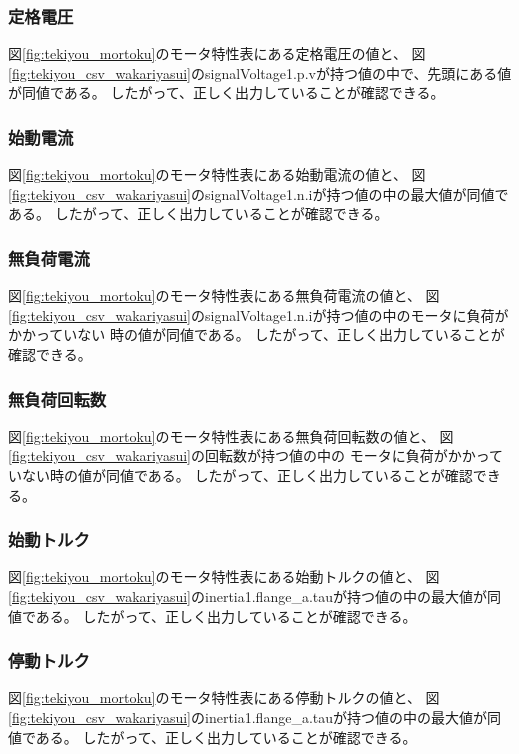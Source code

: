 \subsubsection{定格電圧}
図\ref{fig:tekiyou_mortoku}のモータ特性表にある定格電圧の値と、
図\ref{fig:tekiyou_csv_wakariyasui}のsignalVoltage1.p.vが持つ値の中で、先頭にある値が同値である。
したがって、正しく出力していることが確認できる。

\subsubsection{始動電流}
図\ref{fig:tekiyou_mortoku}のモータ特性表にある始動電流の値と、
図\ref{fig:tekiyou_csv_wakariyasui}のsignalVoltage1.n.iが持つ値の中の最大値が同値である。
したがって、正しく出力していることが確認できる。


\subsubsection{無負荷電流}
図\ref{fig:tekiyou_mortoku}のモータ特性表にある無負荷電流の値と、
図\ref{fig:tekiyou_csv_wakariyasui}のsignalVoltage1.n.iが持つ値の中のモータに負荷がかかっていない
時の値が同値である。
したがって、正しく出力していることが確認できる。
\subsubsection{無負荷回転数}
図\ref{fig:tekiyou_mortoku}のモータ特性表にある無負荷回転数の値と、
図\ref{fig:tekiyou_csv_wakariyasui}の回転数が持つ値の中の
モータに負荷がかかっていない時の値が同値である。
したがって、正しく出力していることが確認できる。

\subsubsection{始動トルク}
図\ref{fig:tekiyou_mortoku}のモータ特性表にある始動トルクの値と、
図\ref{fig:tekiyou_csv_wakariyasui}のinertia1.flange\_a.tauが持つ値の中の最大値が同値である。
したがって、正しく出力していることが確認できる。

\subsubsection{停動トルク}
図\ref{fig:tekiyou_mortoku}のモータ特性表にある停動トルクの値と、
図\ref{fig:tekiyou_csv_wakariyasui}のinertia1.flange\_a.tauが持つ値の中の最大値が同値である。
したがって、正しく出力していることが確認できる。


